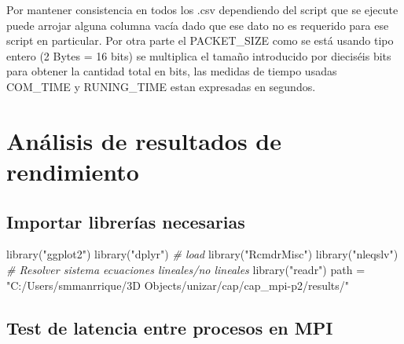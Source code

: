 \documentclass[
]{article}
\newenvironment{Shaded}{\begin{snugshade}}{\end{snugshade}}
\newcommand{\CommentTok}[1]{\textcolor[rgb]{0.56,0.35,0.01}{\textit{#1}}}
\newcommand{\FunctionTok}[1]{\textcolor[rgb]{0.00,0.00,0.00}{#1}}
\newcommand{\NormalTok}[1]{#1}
\newcommand{\OtherTok}[1]{\textcolor[rgb]{0.56,0.35,0.01}{#1}}
\newcommand{\StringTok}[1]{\textcolor[rgb]{0.31,0.60,0.02}{#1}}
\begin{document}
Por mantener consistencia en todos los .csv dependiendo del script que
se ejecute puede arrojar alguna columna vacía dado que ese dato no es
requerido para ese script en particular. Por otra parte el PACKET\_SIZE
como se está usando tipo entero (2 Bytes = 16 bits) se multiplica el
tamaño introducido por dieciséis bits para obtener la cantidad total en
bits, las medidas de tiempo usadas COM\_TIME y RUNING\_TIME estan
expresadas en segundos.

\hypertarget{anuxe1lisis-de-resultados-de-rendimiento}{%
\section{Análisis de resultados de
rendimiento}\label{anuxe1lisis-de-resultados-de-rendimiento}}

\hypertarget{importar-libreruxedas-necesarias}{%
\subsection{Importar librerías
necesarias}\label{importar-libreruxedas-necesarias}}

\begin{Shaded}
\begin{Highlighting}[]
\FunctionTok{library}\NormalTok{(}\StringTok{"ggplot2"}\NormalTok{)}
\FunctionTok{library}\NormalTok{(}\StringTok{"dplyr"}\NormalTok{)         }\CommentTok{\# load}
\FunctionTok{library}\NormalTok{(}\StringTok{"RcmdrMisc"}\NormalTok{)}
\FunctionTok{library}\NormalTok{(}\StringTok{"nleqslv"}\NormalTok{)       }\CommentTok{\# Resolver sistema ecuaciones lineales/no lineales}
\FunctionTok{library}\NormalTok{(}\StringTok{"readr"}\NormalTok{)}
\NormalTok{path }\OtherTok{=} \StringTok{"C:/Users/smmanrrique/3D Objects/unizar/cap/cap\_mpi{-}p2/results/"}
\end{Highlighting}
\end{Shaded}

\hypertarget{test-de-latencia-entre-procesos-en-mpi}{%
\subsection{Test de latencia entre procesos en
MPI}\label{test-de-latencia-entre-procesos-en-mpi}}
\end{document}
